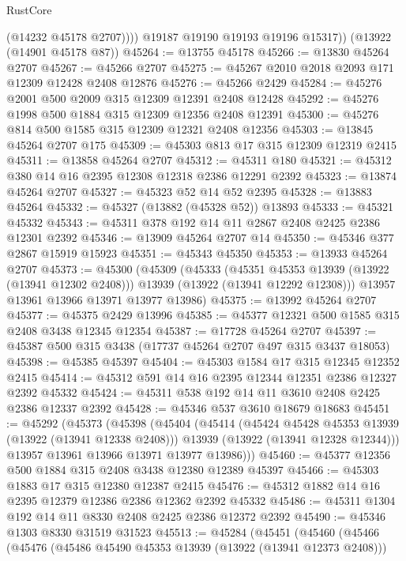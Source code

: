 \begin{lexlean}{RustCore}
\begin{coremodule}
              (@14232 @45178 @2707))))
        @19187
        @19190
        @19193
        @19196
        @15317))
    (@13922 (@14901 @45178 @87))
@45264 := @13755 @45178
@45266 := @13830 @45264 @2707
@45267 := @45266 @2707
@45275 := @45267 @2010 @2018 @2093 @171 @12309 @12428 @2408 @12876
@45276 := @45266 @2429
@45284 := @45276 @2001 @500 @2009 @315 @12309 @12391 @2408 @12428
@45292 := @45276 @1998 @500 @1884 @315 @12309 @12356 @2408 @12391
@45300 := @45276 @814 @500 @1585 @315 @12309 @12321 @2408 @12356
@45303 := @13845 @45264 @2707 @175
@45309 := @45303 @813 @17 @315 @12309 @12319 @2415
@45311 := @13858 @45264 @2707
@45312 := @45311 @180
@45321 := @45312 @380 @14 @16 @2395 @12308 @12318 @2386 @12291 @2392
@45323 := @13874 @45264 @2707
@45327 := @45323 @52 @14 @52 @2395
@45328 := @13883 @45264
@45332 := @45327 (@13882 (@45328 @52)) @13893
@45333 := @45321 @45332
@45343 := @45311 @378 @192 @14 @11 @2867 @2408 @2425 @2386 @12301 @2392
@45346 := @13909 @45264 @2707 @14
@45350 := @45346 @377 @2867 @15919 @15923
@45351 := @45343 @45350
@45353 := @13933 @45264 @2707
@45373 := @45300
    (@45309
      (@45333
        (@45351 @45353 @13939 (@13922 (@13941 @12302 @2408)))
        @13939
        (@13922 (@13941 @12292 @12308)))
      @13957
      @13961
      @13966
      @13971
      @13977
      @13986)
@45375 := @13992 @45264 @2707
@45377 := @45375 @2429 @13996
@45385 := @45377 @12321 @500 @1585 @315 @2408 @3438 @12345 @12354
@45387 := @17728 @45264 @2707
@45397 := @45387 @500 @315 @3438 (@17737 @45264 @2707 @497 @315 @3437 @18053)
@45398 := @45385 @45397
@45404 := @45303 @1584 @17 @315 @12345 @12352 @2415
@45414 := @45312 @591 @14 @16 @2395 @12344 @12351 @2386 @12327 @2392 @45332
@45424 := @45311 @538 @192 @14 @11 @3610 @2408 @2425 @2386 @12337 @2392
@45428 := @45346 @537 @3610 @18679 @18683
@45451 := @45292
    (@45373
      (@45398
        (@45404
          (@45414
            (@45424 @45428 @45353 @13939 (@13922 (@13941 @12338 @2408)))
            @13939
            (@13922 (@13941 @12328 @12344)))
          @13957
          @13961
          @13966
          @13971
          @13977
          @13986)))
@45460 := @45377 @12356 @500 @1884 @315 @2408 @3438 @12380 @12389 @45397
@45466 := @45303 @1883 @17 @315 @12380 @12387 @2415
@45476 := @45312 @1882 @14 @16 @2395 @12379 @12386 @2386 @12362 @2392 @45332
@45486 := @45311 @1304 @192 @14 @11 @8330 @2408 @2425 @2386 @12372 @2392
@45490 := @45346 @1303 @8330 @31519 @31523
@45513 := @45284
    (@45451
      (@45460
        (@45466
          (@45476
            (@45486 @45490 @45353 @13939 (@13922 (@13941 @12373 @2408)))

\end{coremodule}
\end{lexlean}
